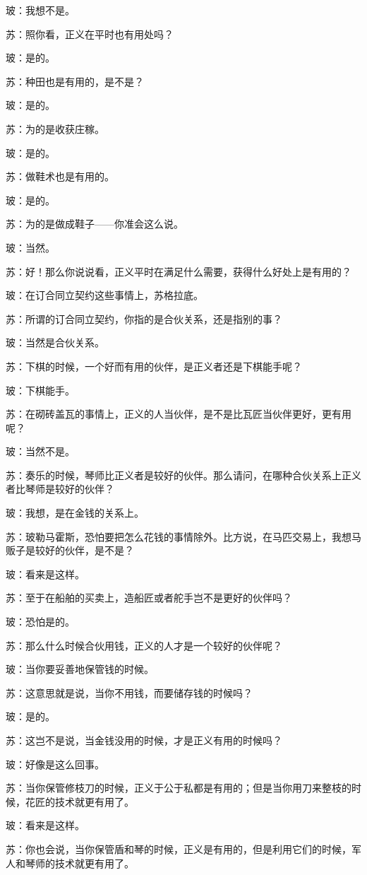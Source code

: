\documentclass[12pt,oneside]{book}
\begin{document}
玻：我想不是。

苏：照你看，正义在平时也有用处吗？

玻：是的。

苏：种田也是有用的，是不是？

玻：是的。

苏：为的是收获庄稼。

玻：是的。

苏：做鞋术也是有用的。

玻：是的。

苏：为的是做成鞋子——你准会这么说。

玻：当然。

苏：好！那么你说说看，正义平时在满足什么需要，获得什么好处上是有用的？

玻：在订合同立契约这些事情上，苏格拉底。

苏：所谓的订合同立契约，你指的是合伙关系，还是指别的事？

玻：当然是合伙关系。

苏：下棋的时候，一个好而有用的伙伴，是正义者还是下棋能手呢？

玻：下棋能手。

苏：在砌砖盖瓦的事情上，正义的人当伙伴，是不是比瓦匠当伙伴更好，更有用呢？

玻：当然不是。

苏：奏乐的时候，琴师比正义者是较好的伙伴。那么请问，在哪种合伙关系上正义者比琴师是较好的伙伴？

玻：我想，是在金钱的关系上。

苏：玻勒马霍斯，恐怕要把怎么花钱的事情除外。比方说，在马匹交易上，我想马贩子是较好的伙伴，是不是？

玻：看来是这样。

苏：至于在船舶的买卖上，造船匠或者舵手岂不是更好的伙伴吗？

玻：恐怕是的。

苏：那么什么时候合伙用钱，正义的人才是一个较好的伙伴呢？

玻：当你要妥善地保管钱的时候。

苏：这意思就是说，当你不用钱，而要储存钱的时候吗？

玻：是的。

苏：这岂不是说，当金钱没用的时候，才是正义有用的时候吗？

玻：好像是这么回事。

苏：当你保管修枝刀的时候，正义于公于私都是有用的；但是当你用刀来整枝的时候，花匠的技术就更有用了。

玻：看来是这样。

苏：你也会说，当你保管盾和琴的时候，正义是有用的，但是利用它们的时候，军人和琴师的技术就更有用了。
\end{document}
